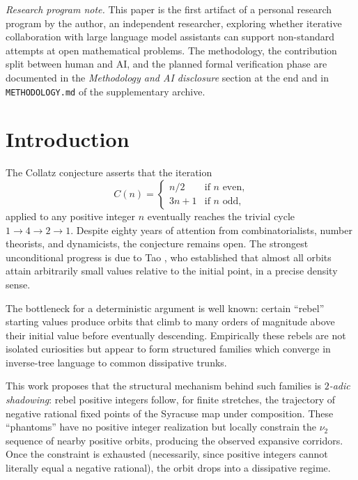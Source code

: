 \documentclass[11pt,a4paper]{article}
\theoremstyle{definition}
\begin{document}
\noindent\textit{Research program note.} This paper is the first
artifact of a personal research program by the author, an independent
researcher, exploring whether iterative collaboration with large
language model assistants can support non-standard attempts at open
mathematical problems. The methodology, the contribution split between
human and AI, and the planned formal verification phase are
documented in the \emph{Methodology and AI disclosure} section at the
end and in \texttt{METHODOLOGY.md} of the supplementary archive.
\medskip

\tableofcontents

\section{Introduction}
\label{sec:intro}

The Collatz conjecture asserts that the iteration
\[
C(n) =
\begin{cases}
n/2 & \text{if } n \text{ even,} \\
3n+1 & \text{if } n \text{ odd,}
\end{cases}
\]
applied to any positive integer $n$ eventually reaches the trivial
cycle $1 \to 4 \to 2 \to 1$. Despite eighty years of attention from
combinatorialists, number theorists, and dynamicists, the conjecture
remains open. The strongest unconditional progress is due to Tao
\cite{tao2019}, who established that almost all orbits attain
arbitrarily small values relative to the initial point, in a precise
density sense.

The bottleneck for a deterministic argument is well known: certain
``rebel'' starting values produce orbits that climb to many orders
of magnitude above their initial value before eventually descending.
Empirically these rebels are not isolated curiosities but appear to
form structured families which converge in inverse-tree language to
common dissipative trunks.

This work proposes that the structural mechanism behind such families
is \emph{$2$-adic shadowing}: rebel positive integers follow, for
finite stretches, the trajectory of negative rational fixed points
of the Syracuse map under composition. These ``phantoms'' have no
positive integer realization but locally constrain the $\nu_2$
sequence of nearby positive orbits, producing the observed expansive
corridors. Once the constraint is exhausted (necessarily, since
positive integers cannot literally equal a negative rational), the
orbit drops into a dissipative regime.
\end{document}
